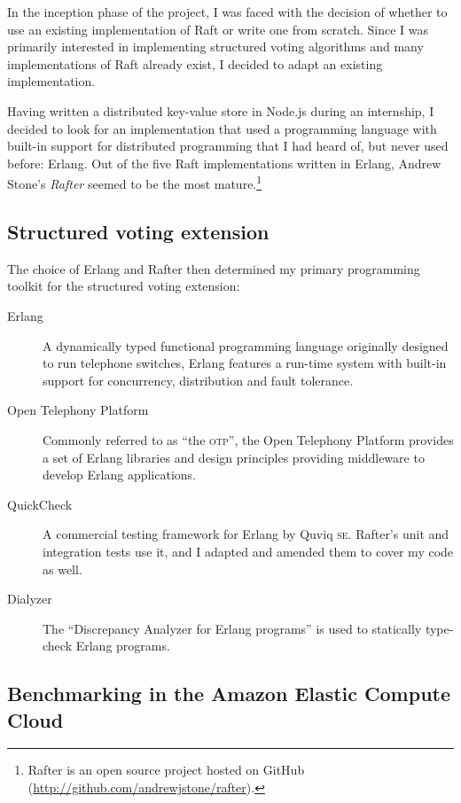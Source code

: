 \documentclass[12pt,chapterprefix=true,toc=bibliography,numbers=noendperiod,
               footnotes=multiple,twoside]{scrreprt}
\begin{document}
In the inception phase of the project, I was faced with the decision of whether to use an existing implementation of Raft or write one from scratch. Since I was primarily interested in implementing structured voting algorithms and many implementations of Raft already exist, I decided to adapt an existing implementation.

Having written a distributed key-value store in Node.js during an internship, I decided to look for an implementation that used a programming language with built-in support for distributed programming that I had heard of, but never used before: Erlang. Out of the five Raft implementations written in Erlang, Andrew Stone's \emph{Rafter} seemed to be the most mature.\footnote{Rafter is an open source project hosted on GitHub (\url{http://github.com/andrewjstone/rafter}).}

\subsection{Structured voting extension}

The choice of Erlang and Rafter then determined my primary programming toolkit for the structured voting extension:

\begin{description}
    \item[Erlang] A dynamically typed functional programming language originally designed to run telephone switches, Erlang features a run-time system with built-in support for concurrency, distribution and fault tolerance.
    \item[Open Telephony Platform] Commonly referred to as \enquote{the \textsc{otp}}, the Open Telephony Platform provides a set of Erlang libraries and design principles providing middleware to develop Erlang applications.
    \item[QuickCheck] A commercial testing framework for Erlang by Quviq \textsc{se}. Rafter's unit and integration tests use it, and I adapted and amended them to cover my code as well.
    \item[Dialyzer] The \enquote{Discrepancy Analyzer for Erlang programs} is used to statically type-check Erlang programs.
\end{description}

\subsection{Benchmarking in the Amazon Elastic Compute Cloud}
\label{ssc:ec2-benchmarking}
\end{document}
